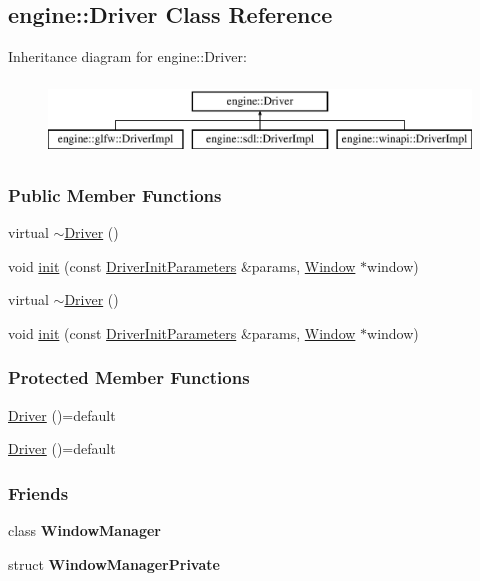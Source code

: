 \hypertarget{a00024}{}\subsection{engine\+:\+:Driver Class Reference}
\label{a00024}
Inheritance diagram for engine\+:\+:Driver\+:\begin{figure}[H]
\begin{center}
\leavevmode
\includegraphics[height=2.000000cm]{a00024}
\end{center}
\end{figure}
\subsubsection*{Public Member Functions}
\begin{DoxyCompactItemize}
\item 
virtual \hyperlink{a00024_a4772e871ef5639c84cbb5569d75c1de9}{$\sim$\+Driver} ()
\item 
void \hyperlink{a00024_a4e283b1274b6ffea595cb7329b09c16d}{init} (const \hyperlink{a00028}{Driver\+Init\+Parameters} \&params, \hyperlink{a00082}{Window} $\ast$window)
\item 
virtual \hyperlink{a00024_a4772e871ef5639c84cbb5569d75c1de9}{$\sim$\+Driver} ()
\item 
void \hyperlink{a00024_a4e283b1274b6ffea595cb7329b09c16d}{init} (const \hyperlink{a00028}{Driver\+Init\+Parameters} \&params, \hyperlink{a00082}{Window} $\ast$window)
\end{DoxyCompactItemize}
\subsubsection*{Protected Member Functions}
\begin{DoxyCompactItemize}
\item 
\hyperlink{a00024_aed71bf52de93e2fc50f12eb860a52acc}{Driver} ()=default
\item 
\hyperlink{a00024_aed71bf52de93e2fc50f12eb860a52acc}{Driver} ()=default
\end{DoxyCompactItemize}
\subsubsection*{Friends}
\begin{DoxyCompactItemize}
\item 
class {\bfseries Window\+Manager}\hypertarget{a00024_a8bf419dae80cc317c90469d0199cfdd5}{}\label{a00024_a8bf419dae80cc317c90469d0199cfdd5}

\item 
struct {\bfseries Window\+Manager\+Private}\hypertarget{a00024_a1e888245e5e110e096f9476dd22b68ec}{}\label{a00024_a1e888245e5e110e096f9476dd22b68ec}

\end{DoxyCompactItemize}


